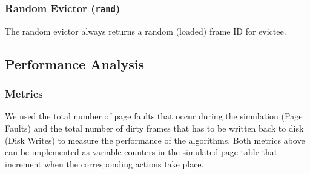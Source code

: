 \documentclass[letterpaper]{article}
\begin{document}
\subsubsection{Random Evictor (\texttt{rand})}
The random evictor always returns a random (loaded) frame ID for evictee.
\subsection{Performance Analysis}
\subsubsection{Metrics}\label{sec:metrics}
We used the total number of page faults that occur during the simulation (Page Faults) and the total number of dirty frames that has to be written back to disk (Disk Writes) to measure the performance of the algorithms. Both metrics above can be implemented as variable counters in the simulated page table that increment when the corresponding actions take place.
\end{document}
